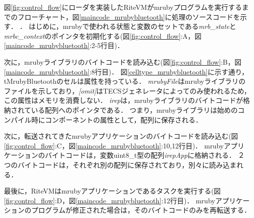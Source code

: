 \documentclass[submit,techrep]{ipsj}
\begin{document}
図\ref{fig:control_flow}にローダを実装したRiteVMがmrubyプログラムを実行するまでのフローチャート，図\ref{maincode_mrubybluetooth}に処理のソースコードを示す．
．
はじめに，mrubyで使われる状態と変数のセットである{\it mrb\_state}と{\it mrbc\_context}のポインタを初期化する(図\ref{fig:control_flow}:A，図\ref{maincode_mrubybluetooth}:2-5行目)．

次に，mrubyライブラリのバイトコードを読み込む(図\ref{fig:control_flow}:B，図\ref{maincode_mrubybluetooth}:8行目)．
図\ref{celltype_mrubybluetooth}に示す通り，tMrubyBluetoothのセルは属性を持っている．
{\it mrubyFile}はmrubyライブラリのファイルを示しており，{\it [omit]}はTECSジェネレータによってのみ使われるため，この属性はメモリを消費しない．
{\it irep}は，mrubyライブラリのバイトコードが格納されている配列へのポインタである．
つまり，mrubyライブラリは始めのコンパイル時にコンポーネントの属性として，配列に保存される．

次に，転送されてきたmrubyアプリケーションのバイトコードを読み込む(図\ref{fig:control_flow}:C，図\ref{maincode_mrubybluetooth}:10,12行目)．
mrubyアプリケーションのバイトコードは，変数uint8\_t型の配列{\it irepApp}に格納される．
２つのバイトコードは，それぞれ別の配列に保存されており，別々に読み込まれる．

最後に，RiteVMはmrubyアプリケーションであるタスクを実行する(図\ref{fig:control_flow}:D，図\ref{maincode_mrubybluetooth}:12行目)．
mrubyアプリケーションのプログラムが修正された場合は，そのバイトコードのみを再転送する．
\end{document}
